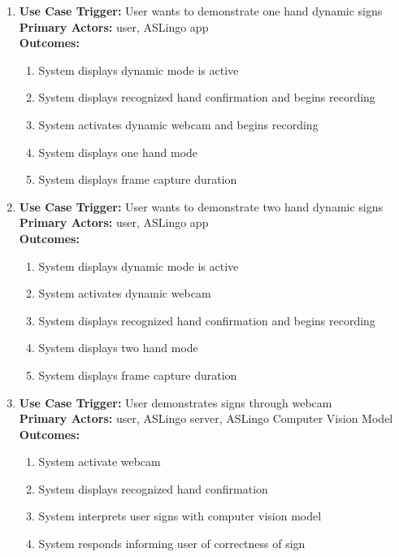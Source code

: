 \documentclass[12pt, titlepage]{article}
\begin{document}
\begin{enumerate}
      \item
      \textbf{Use Case Trigger:} User wants to demonstrate one hand dynamic signs\\
      \textbf{Primary Actors:} user, ASLingo app\\
      \textbf{Outcomes:}
      \begin{enumerate}
          \item System displays dynamic mode is active  
          \item System displays recognized hand confirmation and begins recording       
          \item System activates dynamic webcam and begins recording
          \item System displays one hand mode
          \item System displays frame capture duration        
      \end{enumerate} 

      \item
      \textbf{Use Case Trigger:} User wants to demonstrate two hand dynamic signs\\
      \textbf{Primary Actors:} user, ASLingo app\\
      \textbf{Outcomes:}
      \begin{enumerate}
          \item System displays dynamic mode is active
          \item System activates dynamic webcam
          \item System displays recognized hand confirmation and begins recording        
          \item System displays two hand mode
          \item System displays frame capture duration        
      \end{enumerate} 

      \item
      \textbf{Use Case Trigger:} User demonstrates signs through webcam\\
      \textbf{Primary Actors:} user, ASLingo server, ASLingo Computer Vision Model\\
      \textbf{Outcomes:}
      \begin{enumerate}
          \item System activate webcam
          \item System displays recognized hand confirmation
          \item System interprets user signs with computer vision model
          \item System responds informing user of correctness of sign
      \end{enumerate}


\end{enumerate}
\end{document}
